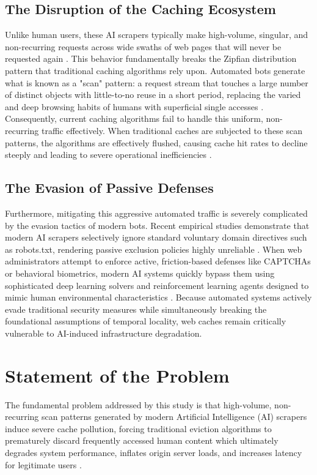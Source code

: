 \subsection{The Disruption of the Caching Ecosystem}
Unlike human users, these AI scrapers typically make high-volume, singular, and non-recurring requests across wide swaths of web pages that will never be requested again \cite{zhang_rethinking_2026}. This behavior fundamentally breaks the Zipfian distribution pattern that traditional caching algorithms rely upon. Automated bots generate what is known as a "scan" pattern: a request stream that touches a large number of distinct objects with little-to-no reuse in a short period, replacing the varied and deep browsing habits of humans with superficial single accesses \cite{zhang_rethinking_2026}. Consequently, current caching algorithms fail to handle this uniform, non-recurring traffic effectively. When traditional caches are subjected to these scan patterns, the algorithms are effectively flushed, causing cache hit rates to decline steeply and leading to severe operational inefficiencies \cite{zhang_rethinking_2026}.

\subsection{The Evasion of Passive Defenses}
Furthermore, mitigating this aggressive automated traffic is severely complicated by the evasion tactics of modern bots. Recent empirical studies demonstrate that modern AI scrapers selectively ignore standard voluntary domain directives such as robots.txt, rendering passive exclusion policies highly unreliable \cite{kim_scrapers_2025}. When web administrators attempt to enforce active, friction-based defenses like CAPTCHAs or behavioral biometrics, modern AI systems quickly bypass them using sophisticated deep learning solvers and reinforcement learning agents designed to mimic human environmental characteristics \cite{ousat_broken_2026}. Because automated systems actively evade traditional security measures while simultaneously breaking the foundational assumptions of temporal locality, web caches remain critically vulnerable to AI-induced infrastructure degradation.

\section{Statement of the Problem}
The fundamental problem addressed by this study is that high-volume, non-recurring scan patterns generated by modern Artificial Intelligence (AI) scrapers induce severe cache pollution, forcing traditional eviction algorithms to prematurely discard frequently accessed human content which ultimately degrades system performance, inflates origin server loads, and increases latency for legitimate users \cite{zhang_rethinking_2026}.

